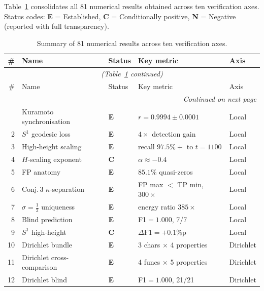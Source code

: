 \documentclass[11pt, a4paper]{article}
\theoremstyle{definition}
\theoremstyle{plain}
\begin{document}
Table~\ref{tab:summary} consolidates all 81 numerical results obtained
across ten verification axes.  Status codes: \textbf{E} = Established,
\textbf{C} = Conditionally positive, \textbf{N} = Negative (reported
with full transparency).

\begin{center}
\small
\begin{longtable}{@{}r l l p{4.2cm} l@{}}
\caption{Summary of 81 numerical results across ten verification
  axes.\label{tab:summary}}\\
\toprule
\# & Name & Status & Key metric & Axis \\
\midrule
\endfirsthead
\multicolumn{5}{c}{\small\itshape (Table~\ref{tab:summary} continued)}\\
\toprule
\# & Name & Status & Key metric & Axis \\
\midrule
\endhead
\midrule
\multicolumn{5}{r}{\small\itshape Continued on next page}\\
\endfoot
\bottomrule
\endlastfoot
1  & Kuramoto synchronisation   & \textbf{E} & $r=0.9994\pm0.0001$              & Local \\
2  & $S^1$ geodesic loss        & \textbf{E} & $4\times$ detection gain          & Local \\
3  & High-height scaling        & \textbf{E} & recall $97.5\%+$ to $t=1100$     & Local \\
4  & $H$-scaling exponent       & \textbf{C} & $\alpha\approx{-0.4}$             & Local \\
5  & FP anatomy                 & \textbf{E} & $85.1\%$ quasi-zeros             & Local \\
6  & Conj.\,3 $\kappa$-separation & \textbf{E} & FP max $<$ TP min, $300\times$ & Local \\
7  & $\sigma=\tfrac{1}{2}$ uniqueness & \textbf{E} & energy ratio $385\times$ & Local \\
8  & Blind prediction           & \textbf{E} & F1$=1.000$, 7/7                   & Local \\
9  & $S^1$ high-height          & \textbf{C} & $\Delta\text{F1}=+0.1$\%p         & Local \\
\midrule
10 & Dirichlet bundle           & \textbf{E} & 3 chars $\times$ 4 properties    & Dirichlet \\
11 & Dirichlet cross-comparison & \textbf{E} & 4 funcs $\times$ 5 properties    & Dirichlet \\
12 & Dirichlet blind            & \textbf{E} & F1$=1.000$, 21/21                 & Dirichlet \\

\end{longtable}
\end{center}
\end{document}
